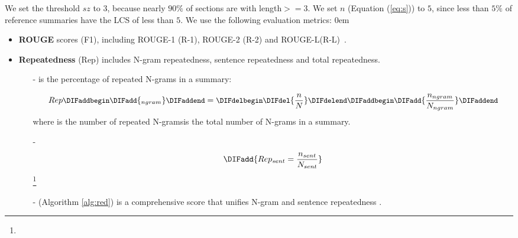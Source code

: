 We set the threshold $sz$ to $3$, 
because nearly $90\%$ 
of sections are with length$>=$3.
We set $n$ (Equation (\ref{eq:s})) to $5$,
since less than $5\%$ of reference summaries have
the LCS of less than $5$.
We use the following evaluation metrics:
\itemsep0em
\begin{itemize}

\item \textbf{ROUGE} scores (F1), including ROUGE-1 (R-1), ROUGE-2 (R-2) and
ROUGE-L(R-L)~\cite{rouge-a-package-for-automatic-evaluation-of-summaries}.
\DIFaddbegin {}\DIFaddend 

\item \textbf{Repeatedness} (Rep) 
includes N-gram repeatedness, sentence repeatedness
and total repeatedness.
\DIFdelbegin {}\DIFdelend \DIFaddbegin \begin{itemize}
\item[-] \textbf{} \DIFaddend is the percentage of repeated N-grams 
\DIFdelbegin {}\DIFdelend in a summary:

\begin{equation}
\small Rep\DIFaddbegin \DIFadd{_{ngram} }\DIFaddend = \DIFdelbegin \DIFdel{\frac{n}{N}
}\DIFdelend \DIFaddbegin \DIFadd{\frac{n_{ngram}}{N_{ngram}}
}\DIFaddend \end{equation}
where \DIFdelbegin {}\DIFdelend \DIFaddbegin {}\DIFaddend is the number of repeated N-grams\DIFdelbegin {}\DIFdelend \DIFaddbegin {}\DIFaddend is the total number of N-grams \DIFdelbegin {}\DIFdelend in a summary.
\DIFdelbegin {}\textit{} %
\DIFdelend \DIFaddbegin \item[-] \textbf{} \begin{equation}
\DIFadd{\small Rep_{sent} = \frac{n_{sent}}{N_{sent}}
}\end{equation}
\footnote{
}
\item[-] 
\textbf{} \DIFaddend (Algorithm \ref{alg:red}) is a comprehensive score
that unifies \DIFaddbegin {}\DIFaddend N-gram \DIFaddbegin {}\DIFaddend and sentence repeatedness \DIFaddbegin {}\DIFaddend .


\end{itemize}
\end{itemize}

